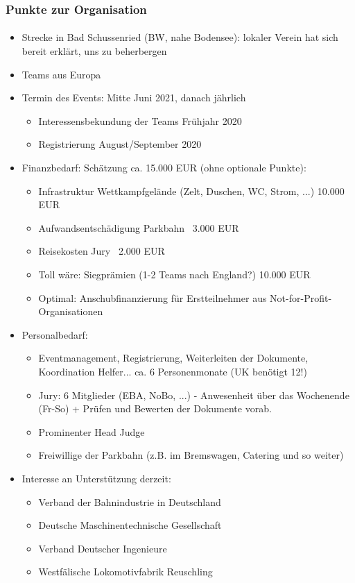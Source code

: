 \documentclass[slidestop,compress,mathserif, aspectratio = 169]{beamer}
\begin{document}
{\begin{frame}[allowframebreaks]
\frametitle{Punkte zur Organisation}
\framesubtitle{}
\begin{itemize}
\item Strecke in Bad Schussenried (BW, nahe Bodensee): lokaler Verein hat sich bereit erklärt, uns zu beherbergen
\item Teams aus Europa
\item Termin des Events: Mitte Juni 2021, danach jährlich
\begin{itemize}
		\item Interessensbekundung der Teams Frühjahr 2020
		\item Registrierung August/September 2020
		\end{itemize} 
\item Finanzbedarf: Schätzung ca. 15.000 EUR (ohne optionale Punkte):
\begin{itemize}
		\item Infrastruktur Wettkampfgelände (Zelt, Duschen, WC, Strom, ...) 10.000 EUR
    		\item Aufwandsentschädigung Parkbahn ~3.000 EUR
   		\item  Reisekosten Jury ~2.000 EUR
    		\item Toll wäre: Siegprämien (1-2 Teams nach England?) 10.000 EUR
    		\item Optimal: Anschubfinanzierung für Erstteilnehmer aus Not-for-Profit-Organisationen		
		\end{itemize}\framebreak
\item Personalbedarf:
	\begin{itemize}
		\item Eventmanagement, Registrierung, Weiterleiten der Dokumente, Koordination Helfer... ca. 6 Personenmonate (UK benötigt 12!)
    		\item Jury: 6 Mitglieder (EBA, NoBo, ...) - Anwesenheit über das Wochenende (Fr-So) + Prüfen und Bewerten der Dokumente vorab. 	
		\item Prominenter Head Judge
    		\item Freiwillige der Parkbahn (z.B. im Bremswagen, Catering und so weiter)
		\end{itemize}
\item Interesse an Unterst\"utzung derzeit:
\begin{itemize}
		\item Verband der Bahnindustrie in Deutschland
		\item Deutsche Maschinentechnische Gesellschaft
		\item Verband Deutscher Ingenieure
		\item Westf\"alische Lokomotivfabrik Reuschling 
		\end{itemize}
		\end{itemize}
\end{frame}


}
\end{document}

